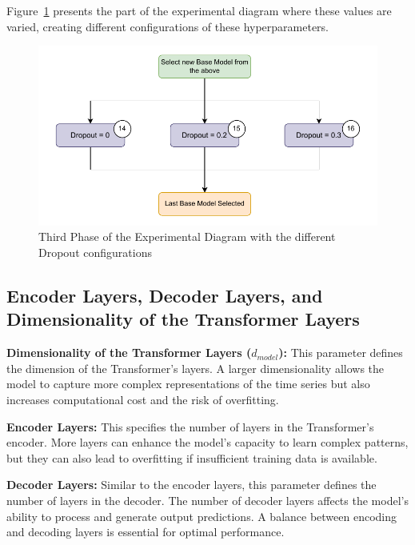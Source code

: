 Figure~\ref{D3} presents the part of the experimental diagram where these values are varied, creating different configurations of these hyperparameters.

\begin{figure}[htbp]
    \centering
    \includegraphics[width=13 cm]{5_ChapterDesign/figuras/Diagrams/D3.pdf}
    \caption{Third Phase of the Experimental Diagram with the different Dropout configurations}
    \label{D3}
\end{figure}

\subsection{Encoder Layers, Decoder Layers, and Dimensionality of the Transformer Layers}

\textbf{Dimensionality of the Transformer Layers (\(d_{model}\)):} This parameter defines the dimension of the Transformer's layers. A larger dimensionality allows the model to capture more complex representations of the time series but also increases computational cost and the risk of overfitting.

\vspace{10pt}

\noindent\textbf{Encoder Layers:} This specifies the number of layers in the Transformer's encoder. More layers can enhance the model's capacity to learn complex patterns, but they can also lead to overfitting if insufficient training data is available.

\vspace{10pt}

\noindent\textbf{Decoder Layers:} Similar to the encoder layers, this parameter defines the number of layers in the decoder. The number of decoder layers affects the model's ability to process and generate output predictions. A balance between encoding and decoding layers is essential for optimal performance.

